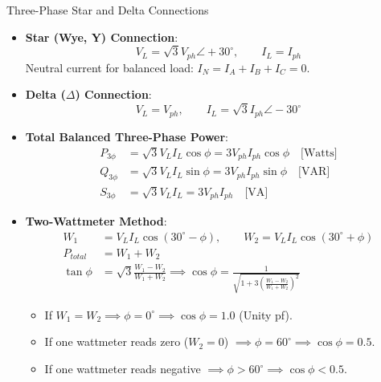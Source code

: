 \begin{formulabox}{Three-Phase Star and Delta Connections}
\begin{itemize}[leftmargin=1.5em]
    \item \textbf{Star (Wye, Y) Connection}:
    \[ V_L = \sqrt{3} V_{ph} \angle +30^\circ, \qquad I_L = I_{ph} \]
    Neutral current for balanced load: $I_N = I_A + I_B + I_C = 0$.
    \item \textbf{Delta ($\Delta$) Connection}:
    \[ V_L = V_{ph}, \qquad I_L = \sqrt{3} I_{ph} \angle -30^\circ \]
    \item \textbf{Total Balanced Three-Phase Power}:
    \begin{align*}
        P_{3\phi} &= \sqrt{3} V_L I_L \cos\phi = 3 V_{ph} I_{ph} \cos\phi \quad \text{[Watts]} \\
        Q_{3\phi} &= \sqrt{3} V_L I_L \sin\phi = 3 V_{ph} I_{ph} \sin\phi \quad \text{[VAR]} \\
        S_{3\phi} &= \sqrt{3} V_L I_L = 3 V_{ph} I_{ph} \quad \text{[VA]}
    \end{align*}
    \item \textbf{Two-Wattmeter Method}:
    \begin{align*}
        W_1 &= V_L I_L \cos(30^\circ - \phi), \qquad W_2 = V_L I_L \cos(30^\circ + \phi) \\
        P_{total} &= W_1 + W_2 \\
        \tan\phi &= \sqrt{3}\frac{W_1 - W_2}{W_1 + W_2} \implies \cos\phi = \frac{1}{\sqrt{1 + 3\left(\frac{W_1 - W_2}{W_1 + W_2}\right)^2}}
    \end{align*}
    \begin{itemize}
        \item If $W_1 = W_2 \implies \phi = 0^\circ \implies \cos\phi = 1.0$ (Unity pf).
        \item If one wattmeter reads zero ($W_2 = 0$) $\implies \phi = 60^\circ \implies \cos\phi = 0.5$.
        \item If one wattmeter reads negative $\implies \phi > 60^\circ \implies \cos\phi < 0.5$.
    \end{itemize}
\end{itemize}
\end{formulabox}
